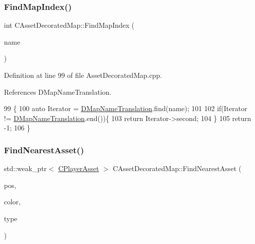 \subsubsection{\texorpdfstring{Find\+Map\+Index()}{FindMapIndex()}}
{\footnotesize\ttfamily int C\+Asset\+Decorated\+Map\+::\+Find\+Map\+Index (\begin{DoxyParamCaption}\item[{const std\+::string \&}]{name }\end{DoxyParamCaption})\hspace{0.3cm}{\ttfamily [static]}}



Definition at line 99 of file Asset\+Decorated\+Map.\+cpp.



References D\+Map\+Name\+Translation.


\begin{DoxyCode}
99                                                          \{
100     \textcolor{keyword}{auto} Iterator = \hyperlink{classCAssetDecoratedMap_afe82d461911e52b7e088da903166f1b3}{DMapNameTranslation}.find(name);
101     
102     \textcolor{keywordflow}{if}(Iterator != \hyperlink{classCAssetDecoratedMap_afe82d461911e52b7e088da903166f1b3}{DMapNameTranslation}.end())\{
103         \textcolor{keywordflow}{return} Iterator->second;
104     \}
105     \textcolor{keywordflow}{return} -1;
106 \}
\end{DoxyCode}
\hypertarget{classCAssetDecoratedMap_a37f9ffaf70ea515c422544a52dd80483}{}\label{classCAssetDecoratedMap_a37f9ffaf70ea515c422544a52dd80483} 
\subsubsection{\texorpdfstring{Find\+Nearest\+Asset()}{FindNearestAsset()}}
{\footnotesize\ttfamily std\+::weak\+\_\+ptr$<$ \hyperlink{classCPlayerAsset}{C\+Player\+Asset} $>$ C\+Asset\+Decorated\+Map\+::\+Find\+Nearest\+Asset (\begin{DoxyParamCaption}\item[{const \hyperlink{classCPosition}{C\+Position} \&}]{pos,  }\item[{\hyperlink{GameDataTypes_8h_aafb0ca75933357ff28a6d7efbdd7602f}{E\+Player\+Color}}]{color,  }\item[{\hyperlink{GameDataTypes_8h_a5600d4fc433b83300308921974477fec}{E\+Asset\+Type}}]{type }\end{DoxyParamCaption})}



